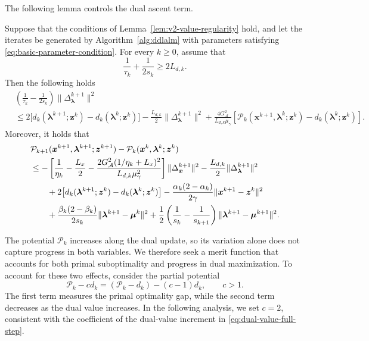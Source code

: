 The following lemma controls the dual ascent term.
\begin{lemma}
\label{lem:dual-value-gain}
Suppose that the conditions of
Lemma~\ref{lem:v2-value-regularity} hold, and let the iterates
be generated by Algorithm~\ref{alg:ddlalm} with parameters satisfying
\eqref{eq:basic-parameter-condition}.
For every $k\ge 0$, assume that
\begin{equation}
\label{eq:dual-gain-condition}
    \frac{1}{\tau_k}+\frac{1}{2s_k} \ge 2L_{d,k}.
\end{equation}
Then the following holds
\begin{equation*}
\begin{aligned}
& \left(\frac{1}{\tau_k}-\frac{1}{2s_k}\right)
  \|\Delta_{\boldsymbol{\lambda}}^{k+1}\|^2 \\
& \le 2\!\bigl[
    d_k(\boldsymbol{\lambda}^{k+1};\mathbf{z}^k)
    -d_k(\boldsymbol{\lambda}^k;\mathbf{z}^k)
  \bigr]
  -\frac{L_{d,k}}{2}
    \|\Delta_{\boldsymbol{\lambda}}^{k+1}\|^2
  +\frac{4G_{\mathcal A}^2}{L_{d,k}\mu_\gamma}
  \left[
    \mathcal P_k(
      \mathbf{x}^{k+1},\boldsymbol{\lambda}^k;\mathbf{z}^k)
    -d_k(\boldsymbol{\lambda}^k;\mathbf{z}^k)
  \right].
\end{aligned}
\end{equation*}
Moreover, it holds that
\begin{equation}
\begin{aligned}
&\mathcal P_{k+1}(\bm{x}^{k+1},\bm{\lambda}^{k+1};\bm{z}^{k+1})
-\mathcal P_k(\bm{x}^k,\bm{\lambda}^k;\bm{z}^k)
\\
&\le
-\left[
\frac1{\eta_k}-\frac{L_x}{2}
-
\frac{2G_{\mathcal A}^2(1/\eta_k+L_x)^2}
{L_{d,k}\mu_\gamma^2}
\right]
\|\Delta_{\bm{x}}^{k+1}\|^2
-\frac{L_{d,k}}2\|\Delta_{\bm{\lambda}}^{k+1}\|^2 \\
&\qquad
+2\bigl[d_k(\bm{\lambda}^{k+1};\bm{z}^k)-d_k(\bm{\lambda}^k;\bm{z}^k)\bigr]
-\frac{\alpha_k(2-\alpha_k)}{2\gamma}
\|\bm{x}^{k+1}-\bm{z}^k\|^2 \\
&\qquad
+\frac{\beta_k(2-\beta_k)}{2s_k}
\|\bm{\lambda}^{k+1}-\bm{\mu}^k\|^2
+\frac12\left(\frac1{s_k}-\frac1{s_{k+1}}\right)
\|\bm{\lambda}^{k+1}-\bm{\mu}^{k+1}\|^2.
\end{aligned}
\label{eq:dual-value-full-step}
\end{equation}
\end{lemma}

The potential $\mathcal P_k$ increases along the dual update, so its variation alone does not capture progress in
both variables. We therefore seek a merit function that accounts for both
primal suboptimality and progress in dual maximization. To account for
these two effects, consider the partial potential
\begin{equation}
\label{eq:partial-potential}
    \mathcal P_k-cd_k
    =(\mathcal P_k-d_k)-(c-1)d_k,
    \qquad c>1.
\end{equation}
The first term measures the primal optimality gap, while the second term
decreases as the dual value increases. In the following analysis, we set
$c=2$, consistent with the coefficient of the dual-value increment in
\eqref{eq:dual-value-full-step}.

